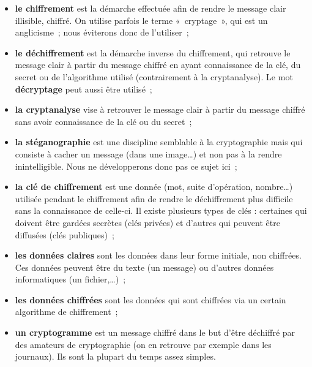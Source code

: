 \begin{itemize}

\item {\sffamily\textbf{le chiffrement}} est la démarche effectuée afin de rendre
  le message clair illisible, chiffré. On utilise parfois le terme
  «~cryptage~», qui est un anglicisme~; nous éviterons donc de
  l'utiliser~;

\item {\sffamily\textbf{le déchiffrement}} est la démarche inverse du chiffrement, qui retrouve
  le message clair à partir du message chiffré en ayant connaissance
  de la clé, du secret ou de l'algorithme utilisé (contrairement à la
  cryptanalyse). Le mot {\sffamily\textbf{décryptage}} peut aussi
être utilisé~;
\item {\sffamily\textbf{la cryptanalyse}} vise à retrouver le
message clair à partir du message chiffré sans avoir connaissance
de la clé ou du secret~;

\item {\sffamily\textbf{la stéganographie}} est une discipline semblable à la
  cryptographie mais qui consiste à cacher un message (dans une
  image\dots) et non pas à la rendre inintelligible. Nous ne
développerons donc pas ce sujet ici~;

\item {\sffamily\textbf{la clé de chiffrement}} est une donnée (mot, suite d'opération,
  nombre\dots) utilisée pendant le chiffrement afin de rendre le
  déchiffrement plus difficile sans la connaissance de celle-ci. Il
  existe plusieurs types de clés : certaines qui doivent être gardées
  secrètes (clés privées) et d'autres qui peuvent être diffusées
  (clés publiques)~;

\item {\sffamily\textbf{les données claires}} sont les données dans leur forme initiale, non
  chiffrées. Ces données peuvent être du texte (un message) ou d'autres
  données informatiques (un fichier,\dots)~;

\item {\sffamily\textbf{les données chiffrées}} sont les données qui
sont chiffrées via un certain
  algorithme de chiffrement~;

\item {\sffamily\textbf{un cryptogramme}} est un message chiffré
dans le but d'être déchiffré par des amateurs de cryptographie (on
en retrouve par exemple dans les journaux). Ils sont la plupart du
temps assez simples.
\end{itemize}
